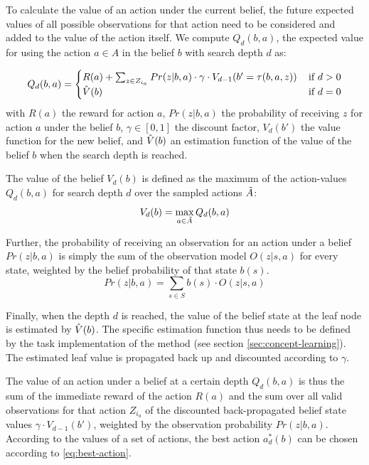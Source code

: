 To calculate the value of an action under the current belief, the future expected values of all possible observations for that action need to be considered and added to the value of the action itself. 
We compute $Q_d(b, a)$, the expected value for using the action $a \in A$ in the belief $b$ with search depth $d$ as:

\begin{equation}
    Q_d(b, a) = \begin{cases}
        R(a) + \sum_{z \in Z_{i_a}} Pr(z|b,a) \cdot \gamma \cdot V_{d-1}(b' = \tau(b, a, z)) & \, \text{if $d > 0$} \\
        \Hat{V}(b) & \, \text{if $d = 0$}
    \end{cases}
\end{equation}
with
$R(a)$ the reward for action $a$,
$Pr(z|b,a)$ the probability of receiving $z$ for action $a$ under the belief $b$,
$\gamma \in [0, 1]$ the discount factor, 
$V_d(b')$ the value function for the new belief,
and
$\Hat{V}(b)$ an estimation function of the value of the belief $b$ when the search depth is reached. 

The value of the belief $V_d(b)$ is defined as the maximum of the action-values $Q_d(b,a)$ for search depth $d$ over the sampled actions $\Tilde{A}$:
\begin{equation}
    V_d(b) = \max_{a \in \Tilde{A}} Q_d(b, a)
\end{equation}

Further, the probability of receiving an observation for an action under a belief $Pr(z|b,a)$ is simply the sum of the observation model $O(z|s,a)$ for every state, weighted by the belief probability of that state $b(s)$.
\begin{equation}
    Pr(z|b,a) = \sum_{s \in S} b(s) \cdot O(z|s,a)
\end{equation}


Finally, when the depth $d$ is reached, the value of the belief state at the leaf node is estimated by $\Hat{V}(b)$.
The specific estimation function thus needs to be defined by the task implementation of the method (see section \ref{sec:concept-learning}).
The estimated leaf value is propagated back up and discounted according to $\gamma$. 

The value of an action under a belief at a certain depth $Q_d(b,a)$ is thus the sum of the immediate reward of the action $R(a)$ and the sum over all valid observations for that action $Z_{i_a}$ of the discounted back-propagated belief state values $\gamma \cdot V_{d-1}(b')$, weighted by the observation probability $Pr(z|b,a)$.
According to the values of a set of actions, the best action $a^*_d(b)$ can be chosen according to \autoref{eq:best-action}.

